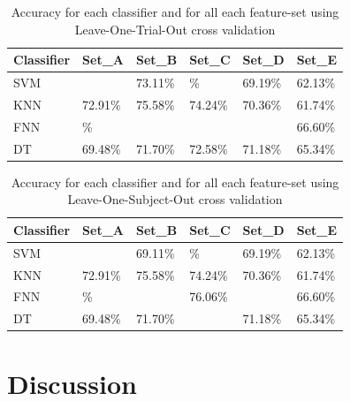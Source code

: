 \documentclass[journal,article,submit,moreauthors,pdftex]{Definitions/mdpi}
\begin{document}
\begin{table}[H]
	\caption{Accuracy for each classifier and for all each feature-set using Leave-One-Trial-Out cross validation }
	\centering
	\begin{tabular}{p{3cm}p{2cm}p{2cm}p{2cm}p{2cm}p{2cm}}
		\toprule
		\textbf{Classifier} & \textbf{Set\_A} & \textbf{Set\_B} & \textbf{Set\_C} & \textbf{Set\_D} & \textbf{Set\_E} \\
		\midrule	
		SVM &  \cellcolor{gray!35}{76.73\%} & 73.11\% & \cellcolor{gray!35}{76.70}\% &69.19\% & 62.13\% \\
		KNN & 72.91\% & 75.58\% & 74.24\% &70.36\% & 61.74\% \\
		FNN & \cellcolor{gray!35}{77.07}\% & \cellcolor{gray!35}{79.87\%} &  \cellcolor{gray!35}{76.06\%} &\cellcolor{gray!35}{73.04\%} & 66.60\% \\
		DT & 69.48\% & 71.70\% & 72.58\% &71.18\% & 65.34\% \\
		\bottomrule
	\end{tabular}
	\label{Table:LOTO_results}
\end{table}

\begin{table}[H]
	\caption{Accuracy for each classifier and for all each feature-set using Leave-One-Subject-Out cross validation }
	\centering
	\begin{tabular}{p{3cm}p{2cm}p{2cm}p{2cm}p{2cm}p{2cm}}
		\toprule
		\textbf{Classifier} & \textbf{Set\_A} & \textbf{Set\_B} & \textbf{Set\_C} & \textbf{Set\_D} & \textbf{Set\_E} \\
		\midrule	
		SVM &  \cellcolor{gray!35}{68.83\%} & 69.11\% & \cellcolor{gray!35}{76.70}\% &69.19\% & 62.13\% \\
		KNN & 72.91\% & 75.58\% & 74.24\% &70.36\% & 61.74\% \\
		FNN & \cellcolor{gray!35}{77.07}\% & \cellcolor{gray!35}{79.87\%} & 76.06\% &\cellcolor{gray!35}{73.04\%} & 66.60\% \\
		DT & 69.48\% & 71.70\% &  \cellcolor{gray!35}{72.58\%} &71.18\% & 65.34\% \\
		\bottomrule
	\end{tabular}
	\label{Table:LOSO_results}
\end{table}
\section{Discussion}
\end{document}
